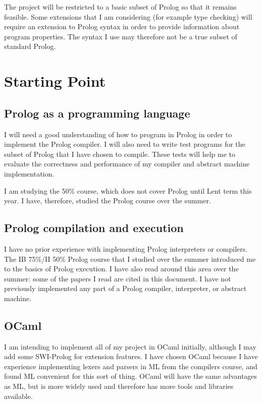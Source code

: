 \documentclass[12pt, a4paper]{article}
\begin{document}
The project will be restricted to a basic subset of Prolog so that it remains feasible. Some extensions that I am considering (for example type checking) will require an extension to Prolog syntax in order to provide information about program properties. The syntax I use may therefore not be a true subset of standard Prolog.


\section*{Starting Point}

\subsection*{Prolog as a programming language}

I will need a good understanding of how to program in Prolog in order to implement the Prolog compiler. I will also need to write test programs for the subset of Prolog that I have chosen to compile. These tests will help me to evaluate the correctness and performance of my compiler and abstract machine implementation.

I am studying the 50\% course, which does not cover Prolog until Lent term this year. I have, therefore, studied the Prolog course over the summer.

\subsection*{Prolog compilation and execution}

I have no prior experience with implementing Prolog interpreters or compilers. The IB 75\%/II 50\% Prolog course that I studied over the summer introduced me to the basics of Prolog execution. I have also read around this area over the summer: some of the papers I read are cited in this document. I have not previously implemented any part of a Prolog compiler, interpreter, or abstract machine.

\subsection*{OCaml}

I am intending to implement all of my project in OCaml initially, although I may add some SWI-Prolog for extension features. I have chosen OCaml because I have experience implementing lexers and parsers in ML from the compilers course, and found ML convenient for this sort of thing. OCaml will have the same advantages as ML, but is more widely used and therefore has more tools and libraries available.
\end{document}
